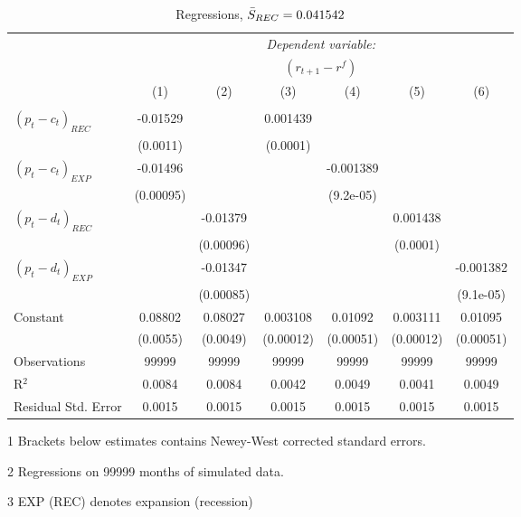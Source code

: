 \begin{table}[H]
\centering   
  \caption{Regressions, $\Bar{S}_{REC} = 0.041542$}           
  \label{tab:regress1}     
  \begin{threeparttable}
\begin{tabular}{@{\hspace{5pt}}l@{\hspace{5pt}}cccccc} 
\toprule 
 & \multicolumn{6}{c}{\textit{Dependent variable:}} \\ 
 & \multicolumn{6}{c}{$\left(r_{t+1}-r^f\right)$} \\ 
 \cmidrule(rr){2-7}
 & (1) & (2) & (3) & (4) & (5) & (6) \\ 
\midrule  
\\[-2.1ex] $\left( p_t - c_t \right)_{REC}$ &-0.01529& &0.001439 & & &\\ 
  & (0.0011) & &(0.0001) & & & \\ 
 \addlinespace 
  $\left( p_t - c_t \right)_{EXP}$ &-0.01496  &    & &-0.001389 & &  \\ 
  & (0.00095) & & &(9.2e-05) & & \\ 
 \addlinespace 
  $\left( p_t - d_t \right)_{REC}$ & &-0.01379& & & 0.001438  &   \\ 
                                   & &  (0.00096) & & & (0.0001) &    \\ 
 \addlinespace 
  $\left( p_t - d_t \right)_{EXP}$ & &   -0.01347& & & &-0.001382 \\ 
                                   & &  (0.00085) & & & &(9.1e-05) \\ 
 \addlinespace 
 Constant &0.08802 &0.08027&0.003108 &0.01092 &0.003111 &0.01095 \\ 
          &(0.0055) &(0.0049)&(0.00012)&(0.00051)&(0.00012)&(0.00051) \\ 
 \addlinespace 
\midrule  
Observations & 99999 & 99999&99999 & 99999&99999&99999\\
R$^{2}$ &0.0084 & 0.0084&0.0042&0.0049&0.0041&0.0049 \\ 
Residual Std. Error &0.0015 & 0.0015&0.0015&0.0015&0.0015&0.0015 \\ 
\bottomrule 
\end{tabular} 
\begin{tablenotes}
\footnotesize{
\item[1] Brackets below estimates contains Newey-West corrected standard errors. 
\item[2] Regressions on 99999 months of simulated data.
\item[3] EXP (REC) denotes expansion (recession)
}
\end{tablenotes}
\end{threeparttable}
\end{table} 
